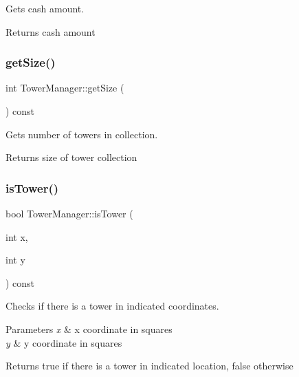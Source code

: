 Gets cash amount. 

\begin{DoxyReturn}{Returns}
cash amount 
\end{DoxyReturn}
\mbox{\label{class_tower_manager_a78683aa19991978f304fbea0b8e25890}} 
\subsubsection{\texorpdfstring{get\+Size()}{getSize()}}
{\footnotesize\ttfamily int Tower\+Manager\+::get\+Size (\begin{DoxyParamCaption}{ }\end{DoxyParamCaption}) const}



Gets number of towers in collection. 

\begin{DoxyReturn}{Returns}
size of tower collection 
\end{DoxyReturn}
\mbox{\label{class_tower_manager_ab4943b63a4d5646ae6a951108732f4f6}} 
\subsubsection{\texorpdfstring{is\+Tower()}{isTower()}}
{\footnotesize\ttfamily bool Tower\+Manager\+::is\+Tower (\begin{DoxyParamCaption}\item[{int}]{x,  }\item[{int}]{y }\end{DoxyParamCaption}) const}



Checks if there is a tower in indicated coordinates. 


\begin{DoxyParams}{Parameters}
{\em x} & x coordinate in squares \\
\hline
{\em y} & y coordinate in squares \\
\hline
\end{DoxyParams}
\begin{DoxyReturn}{Returns}
true if there is a tower in indicated location, false otherwise 
\end{DoxyReturn}
\mbox{\label{class_tower_manager_ad96e7abf6a9d512af64a86d7f44bf1a5}} 
